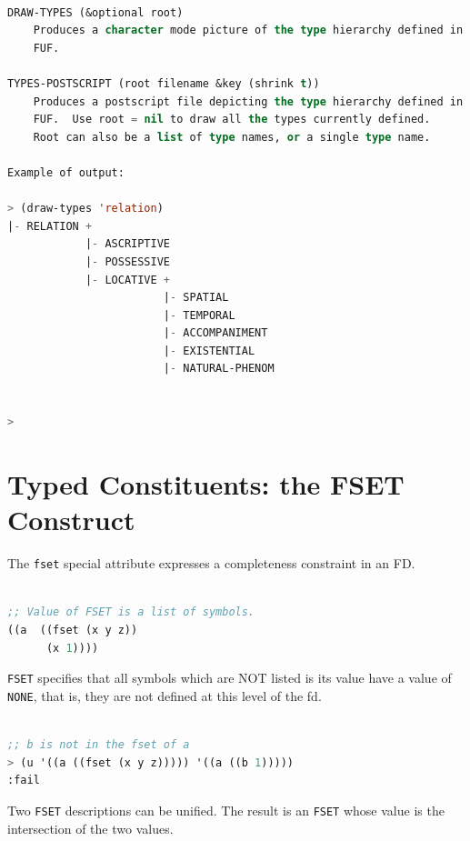 \documentclass[10pt,a4paper]{report}
\begin{document}
\begin{lstlisting}[language=Lisp]

DRAW-TYPES (&optional root)
	Produces a character mode picture of the type hierarchy defined in
	FUF. 
	
TYPES-POSTSCRIPT (root filename &key (shrink t))
	Produces a postscript file depicting the type hierarchy defined in
	FUF.  Use root = nil to draw all the types currently defined.
	Root can also be a list of type names, or a single type name.

Example of output:

> (draw-types 'relation)
|- RELATION +
            |- ASCRIPTIVE
            |- POSSESSIVE
            |- LOCATIVE +
                        |- SPATIAL
                        |- TEMPORAL
                        |- ACCOMPANIMENT
                        |- EXISTENTIAL
                        |- NATURAL-PHENOM
                        
            
> 
\end{lstlisting}




\section{Typed Constituents: the FSET Construct}
\label{fset}

The {\tt fset} special attribute expresses a completeness constraint in an
FD.  

\begin{lstlisting}[language=Lisp]

;; Value of FSET is a list of symbols.
((a  ((fset (x y z))
      (x 1))))

\end{lstlisting}

{\tt FSET} specifies that all symbols which are NOT listed is its value have a
value of {\tt NONE}, that is, they are not defined at this level of the fd.  

\begin{lstlisting}[language=Lisp]

;; b is not in the fset of a
> (u '((a ((fset (x y z))))) '((a ((b 1)))))
:fail  

\end{lstlisting}

Two {\tt FSET} descriptions can be unified.  The result is an {\tt FSET} whose
value is the intersection of the two values.
\end{document}
